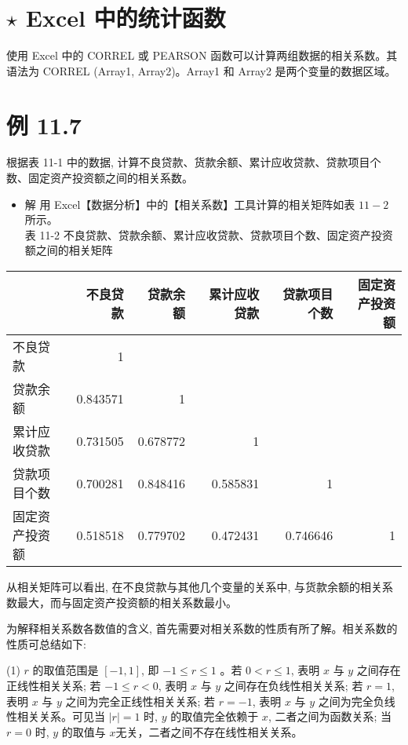\documentclass[10pt]{article}
\begin{document}
\begin{CJK*}{UTF8}{bsmi}
\section*{$\star$ Excel 中的统计函数}
使用 Excel 中的 CORREL 或 PEARSON 函数可以计算两组数据的相关系数。其语法为 CORREL (Array1, Array2)。Array1 和 Array2 是两个变量的数据区域。

\section*{例 11.7}
根据表 11-1 中的数据, 计算不良贷款、货款余额、累计应收贷款、贷款项目个数、固定资产投资额之间的相关系数。

\begin{itemize}
  \item 解 用 Excel【数据分析】中的【相关系数】工具计算的相关矩阵如表 $11-2$ 所示。\\
表 11-2 不良贷款、贷款余额、累计应收贷款、贷款项目个数、固定资产投资额之间的相关矩阵
\end{itemize}

\begin{center}
\begin{tabular}{lrrrrr}
\hline
 & 不良贷款 & 贷款余额 & 累计应收贷款 & 贷款项目个数 & 固定资产投资额 \\
\hline
不良贷款 & 1 &  &  &  &  \\
贷款余额 & 0.843571 & 1 &  &  &  \\
累计应收贷款 & 0.731505 & 0.678772 & 1 &  &  \\
贷款项目个数 & 0.700281 & 0.848416 & 0.585831 & 1 &  \\
固定资产投资额 & 0.518518 & 0.779702 & 0.472431 & 0.746646 & 1 \\
\hline
\end{tabular}
\end{center}

从相关矩阵可以看出, 在不良贷款与其他几个变量的关系中, 与货款余额的相关系数最大，而与固定资产投资额的相关系数最小。

为解释相关系数各数值的含义, 首先需要对相关系数的性质有所了解。相关系数的性质可总结如下:

(1) $r$ 的取值范围是 $[-1,1]$, 即 $-1 \leqslant r \leqslant 1$ 。若 $0<r \leqslant 1$, 表明 $x$ 与 $y$ 之间存在正线性相关关系; 若 $-1 \leqslant r<0$, 表明 $x$ 与 $y$ 之间存在负线性相关关系; 若 $r=1$, 表明 $x$ 与 $y$ 之间为完全正线性相关关系; 若 $r=-1$, 表明 $x$ 与 $y$ 之间为完全负线性相关关系。可见当 $|r|=1$ 时, $y$ 的取值完全依赖于 $x$, 二者之间为函数关系; 当 $r=0$ 时, $y$ 的取值与 $x$无关，二者之间不存在线性相关关系。


\end{CJK*}
\end{document}
